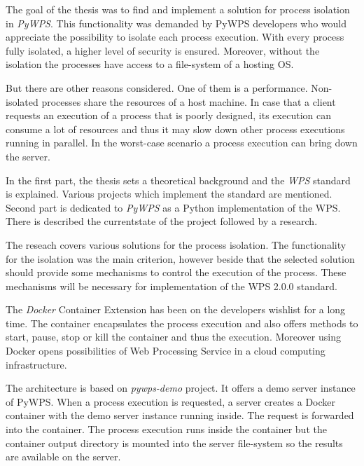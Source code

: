 \newpage
{}

The goal of the thesis was to find and implement a solution for
process isolation in \textit{PyWPS}. This functionality was demanded
by PyWPS developers who would appreciate the possibility to isolate
each process execution. With every process fully isolated, a higher
level of security is ensured. Moreover, without the isolation the
processes have access to a file-system of a hosting OS.

But there are other reasons considered. One of them is a
performance. Non-isolated processes share the resources of a host
machine. In case that a client requests an execution of a process that
is poorly designed, its execution can consume a lot of resources and
thus it may slow down other process executions running in parallel. In
the worst-case scenario a process execution can bring down the server.

In the first part, the thesis sets a theoretical background and
the \textit{WPS} standard is explained. Various projects which implement the
standard are mentioned. Second part is dedicated to \textit{PyWPS} as
a Python implementation of the WPS. There is described the
currentstate of the project followed by a research.

The reseach covers various solutions for the process isolation. The
functionality for the isolation was the main criterion, however beside
that the selected solution should provide some mechanisms to control
the execution of the process. These mechanisms will be necessary for
implementation of the WPS 2.0.0 standard.

The \textit{Docker} Container Extension has been on the developers
wishlist for a long time. The container encapsulates the process
execution and also offers methods to start, pause, stop or kill the
container and thus the execution. Moreover using Docker opens
possibilities of Web Processing Service in a cloud computing
infrastructure.

The architecture is based on \textit{pywps-demo} project. It offers a
demo server instance of PyWPS. When a process execution is requested,
a server creates a Docker container with the demo server instance
running inside. The request is forwarded into the container. The
process execution runs inside the container but the container output
directory is mounted into the server file-system so the results are
available on the server.

